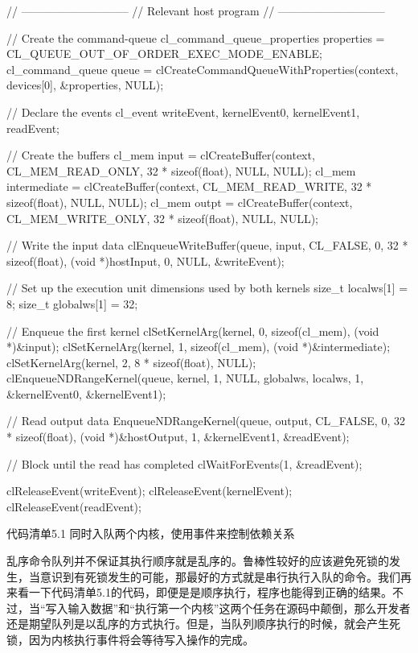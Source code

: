 \begin{codebox}[cpp]
// -----------------------------
// Relevant host program
// -----------------------------

// Create the command-queue
cl_command_queue_properties properties = CL_QUEUE_OUT_OF_ORDER_EXEC_MODE_ENABLE;
cl_command_queue queue = clCreateCommandQueueWithProperties(context, devices[0], &properties, NULL);

// Declare the events
cl_event writeEvent, kernelEvent0, kernelEvent1, readEvent;

// Create the buffers
cl_mem input = clCreateBuffer(context, CL_MEM_READ_ONLY, 32 * sizeof(float), NULL, NULL);
cl_mem intermediate = clCreateBuffer(context, CL_MEM_READ_WRITE, 32 * sizeof(float), NULL, NULL);
cl_mem outpt = clCreateBuffer(context, CL_MEM_WRITE_ONLY, 32 * sizeof(float), NULL, NULL);

// Write the input data
clEnqueueWriteBuffer(queue, input, CL_FALSE, 0, 32 * sizeof(float), (void *)hostInput, 0, NULL, &writeEvent);

// Set up the execution unit dimensions used by both kernels
size_t localws[1] = {8};
size_t globalws[1] = {32};

// Enqueue the first kernel
clSetKernelArg(kernel, 0, sizeof(cl_mem), (void *)&input);
clSetKernelArg(kernel, 1, sizeof(cl_mem), (void *)&intermediate);
clSetKernelArg(kernel, 2, 8 * sizeof(float), NULL);
clEnqueueNDRangeKernel(queue, kernel, 1, NULL, globalws, localws, 1, &kernelEvent0, &kernelEvent1);

// Read output data
EnqueueNDRangeKernel(queue, output, CL_FALSE, 0, 32 * sizeof(float), (void *)&hostOutput, 1, &kernelEvent1, &readEvent);

// Block until the read has completed
clWaitForEvents(1, &readEvent);

clReleaseEvent(writeEvent);
clReleaseEvent(kernelEvent);
clReleaseEvent(readEvent);
\end{codebox}

代码清单5.1 同时入队两个内核，使用事件来控制依赖关系

乱序命令队列并不保证其执行顺序就是乱序的。鲁棒性较好的应该避免死锁的发生，当意识到有死锁发生的可能，那最好的方式就是串行执行入队的命令。我们再来看一下代码清单5.1的代码，即便是是顺序执行，程序也能得到正确的结果。不过，当“写入输入数据”和“执行第一个内核”这两个任务在源码中颠倒，那么开发者还是期望队列是以乱序的方式执行。但是，当队列顺序执行的时候，就会产生死锁，因为内核执行事件将会等待写入操作的完成。

\myRefRule

